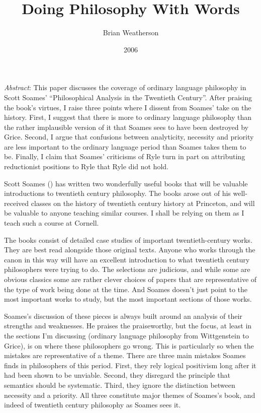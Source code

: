 \documentclass[
  11pt,
  letterpaper,
  DIV=11,
  numbers=noendperiod,
  twoside]{scrartcl}
\title{Doing Philosophy With Words}
\author{Brian Weatherson}
\date{2006}
\renewenvironment{abstract}
 {\vspace{-1.25cm}
 \quotation\small\noindent\emph{Abstract}:}
 {\endquotation}
\begin{document}
\maketitle
\begin{abstract}
This paper discusses the coverage of ordinary language philosophy in
Scott Soames' ``Philosophical Analysis in the Twentieth Century''. After
praising the book's virtues, I raise three points where I dissent from
Soames' take on the history. First, I suggest that there is more to
ordinary language philosophy than the rather implausible version of it
that Soames sees to have been destroyed by Grice. Second, I argue that
confusions between analyticity, necessity and priority are less
important to the ordinary language period than Soames takes them to be.
Finally, I claim that Soames' criticisms of Ryle turn in part on
attributing reductionist positions to Ryle that Ryle did not hold.
\end{abstract}


Scott Soames () has written two
wonderfully useful books that will be valuable introductions to
twentieth century philosophy. The books arose out of his well-received
classes on the history of twentieth century history at Princeton, and
will be valuable to anyone teaching similar courses. I shall be relying
on them as I teach such a course at Cornell.

The books consist of detailed case studies of important
twentieth-century works. They are best read alongside those original
texts. Anyone who works through the canon in this way will have an
excellent introduction to what twentieth century philosophers were
trying to do. The selections are judicious, and while some are obvious
classics some are rather clever choices of papers that are
representative of the type of work being done at the time. And Soames
doesn't just point to the most important works to study, but the most
important sections of those works.

Soames's discussion of these pieces is always built around an analysis
of their strengths and weaknesses. He praises the praiseworthy, but the
focus, at least in the sections I'm discussing (ordinary language
philosophy from Wittgenstein to Grice), is on where these philosophers
go wrong. This is particularly so when the mistakes are representative
of a theme. There are three main mistakes Soames finds in philosophers
of this period. First, they rely logical positivism long after it had
been shown to be unviable. Second, they disregard the principle that
semantics should be systematic. Third, they ignore the distinction
between necessity and a priority. All three constitute major themes of
Soames's book, and indeed of twentieth century philosophy as Soames sees
it.
\end{document}
